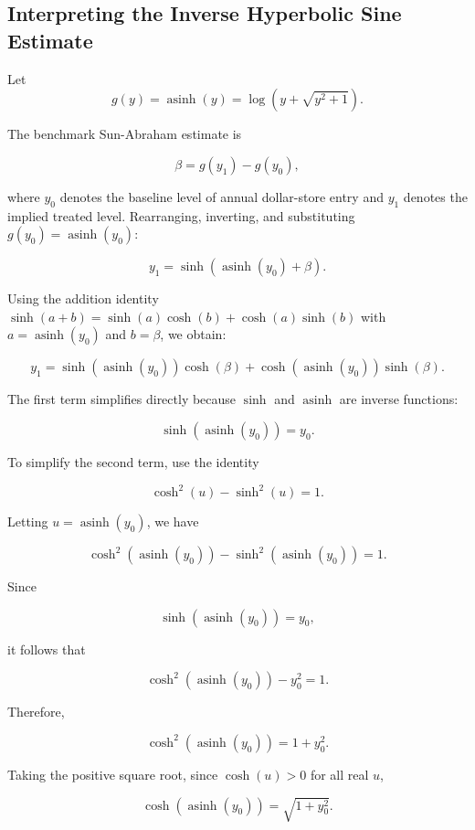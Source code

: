 \documentclass[12pt]{article}
\begin{document}
\begin{appendices}

\section{Interpreting the Inverse Hyperbolic Sine Estimate} \label{app:ihs_att}

Let
\[
g(y) = \operatorname{asinh}(y) = \log\left(y + \sqrt{y^2 + 1}\right).
\]

The benchmark Sun-Abraham estimate is

\[
\beta = g(y_1) - g(y_0),
\]

where \(y_0\) denotes the baseline level of annual dollar-store entry and \(y_1\) denotes the implied treated level. Rearranging, inverting, and substituting \(g(y_0)=\operatorname{asinh}(y_0)\):

\[
y_1 = \sinh\left(\operatorname{asinh}(y_0) + \beta\right).
\]

Using the addition identity \(\sinh(a+b)=\sinh(a)\cosh(b)+\cosh(a)\sinh(b)\) with \(a=\operatorname{asinh}(y_0)\) and \(b=\beta\), we obtain:

\[
y_1
=
\sinh\left(\operatorname{asinh}(y_0)\right)\cosh(\beta)
+
\cosh\left(\operatorname{asinh}(y_0)\right)\sinh(\beta).
\]

The first term simplifies directly because \(\sinh\) and \(\operatorname{asinh}\) are inverse functions:

\[
\sinh\left(\operatorname{asinh}(y_0)\right)=y_0.
\]

To simplify the second term, use the identity

\[
\cosh^2(u)-\sinh^2(u)=1.
\]

Letting \(u=\operatorname{asinh}(y_0)\), we have

\[
\cosh^2\left(\operatorname{asinh}(y_0)\right)
-
\sinh^2\left(\operatorname{asinh}(y_0)\right)
=
1.
\]

Since

\[
\sinh\left(\operatorname{asinh}(y_0)\right)=y_0,
\]

it follows that

\[
\cosh^2\left(\operatorname{asinh}(y_0)\right)-y_0^2=1.
\]

Therefore,

\[
\cosh^2\left(\operatorname{asinh}(y_0)\right)=1+y_0^2.
\]

Taking the positive square root, since \(\cosh(u)>0\) for all real \(u\),

\[
\cosh\left(\operatorname{asinh}(y_0)\right)
=
\sqrt{1+y_0^2}.
\]


\end{appendices}
\end{document}
